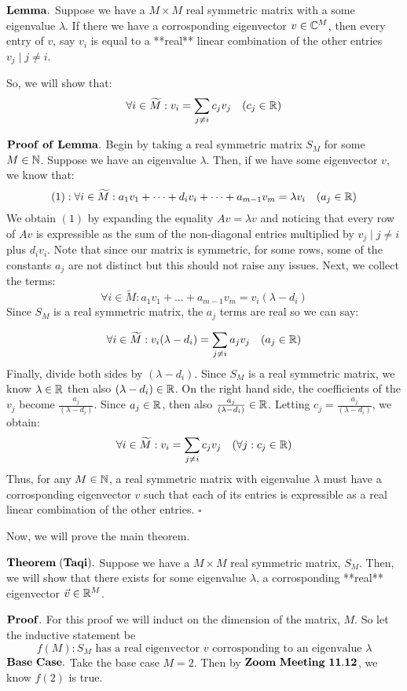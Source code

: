 $\bf Lemma.$ Suppose we have a $M \times M$ real symmetric matrix with a some eigenvalue $\lambda$. If there we have a corrosponding eigenvector $v \in \mathbb{C}^M$, then every entry of $v$, say $v_i$ is equal to a **real** linear combination of the other entries $v_j \mid j \neq i$.

So, we will show that:
$$\forall i \in \widetilde{M}: v_i =  {\sum_{j \neq i} c_j v_j} \quad (c_j \in \mathbb{R})$$

$\bf Proof \,\,of\,\, Lemma.$ Begin by taking a real symmetric matrix $S_M$ for some $M \in \mathbb{N}$. Suppose we have an eigenvalue $\lambda$. Then, if we have some eigenvector $v$, we know that:
$$(1): \forall i \in \widetilde{M} : a_1v_1 + \dots + d_iv_i + \dots + a_{m-1}v_m = \lambda v_i \quad ( a_j \in \mathbb{R})$$
We obtain $(1)$ by expanding the equality $Av = \lambda v$ and noticing that every row of $Av$ is expressible as the sum of the non-diagonal entries multiplied by $v_j \mid j \neq i$ plus $d_i v_i$. Note that since our matrix is symmetric, for some rows, some of the constants $a_j$ are not distinct but this should not raise any issues. Next, we collect the terms:
$$\forall i \in \widetilde{M} : a_1v_1 + \dots + a_{m-1}v_m =  v_i(\lambda - d_i)$$
Since $S_M$ is a real symmetric matrix, the $a_j$ terms are real so we can say:

$$\forall i \in \widetilde{M} :  v_i(\lambda - d_i) = \sum_{j \neq i} a_jv_j \quad (a_j \in \mathbb{R})$$
Finally, divide both sides by $(\lambda - d_i)$. Since $S_M$ is a real symmetric matrix, we know $\lambda \in \mathbb{R}$ then also $(\lambda - d_i) \in \mathbb{R}$. On the right hand side, the coefficients of the $v_j$ become $\frac{a_j}{(\lambda - d_i)}$. Since $a_j \in \mathbb{R}$, then also $\frac{a_j}{(\lambda - d_i)} \in \mathbb{R}$. Letting $c_j = \frac{a_j}{(\lambda - d_i)}$, we obtain:
$$\forall i \in \widetilde{M}: v_i =  {\sum_{j \neq i} c_j v_j} \quad (\forall j: c_j \in \mathbb{R})$$
Thus, for any $M \in \mathbb{N}$, a real symmetric matrix with eigenvalue $\lambda$ must have a corrosponding eigenvector $v$ such that each of its entries is expressible as a real linear combination of the other entries. $\square$

Now, we will prove the main theorem.

$\bf Theorem \; (Taqi).$ Suppose we have a $M \times M$ real symmetric matrix, $S_M$. Then, we will show that there exists for some eigenvalue $\lambda$, a corrosponding **real** eigenvector $\vec{v} \in \mathbb{R}^M$.

$\bf Proof.$ For this proof we will induct on the dimension of the matrix, $M$. So let the inductive statement be
$$f(M) : S_M\text{ has a real eigenvector } v \text{ corrosponding to an eigenvalue } \lambda$$
$\bf Base \,\, Case.$ Take the base case $M = 2$. Then by $\bf Zoom \,\,Meeting\,\, 11.12$, we know $f(2)$ is true.


